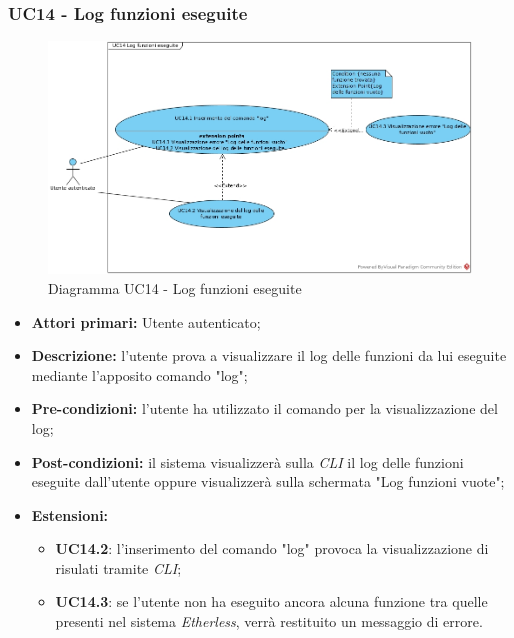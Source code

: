 \subsubsection{UC14 - Log funzioni eseguite}
\begin{figure}[h]
	\centering
	\includegraphics[width=\linewidth]{res/img/UC14.jpg}
	\caption{Diagramma UC14 - Log funzioni eseguite}
\end{figure}
\begin{itemize}
	\item \textbf{Attori primari:} Utente autenticato;
	\item \textbf{Descrizione:} l'utente prova a visualizzare il log delle funzioni da lui eseguite mediante l'apposito comando "log";
	\item \textbf{Pre-condizioni:} l'utente ha utilizzato il comando per la visualizzazione del log;
	\item \textbf{Post-condizioni:} il sistema visualizzerà sulla \textit{CLI\glo} il log delle funzioni eseguite dall'utente oppure visualizzerà sulla schermata "Log funzioni vuote";
	\item \textbf{Estensioni:}
	\begin{itemize}
		\item \textbf{UC14.2}: l'inserimento del comando "log" provoca la visualizzazione di risulati tramite \textit{CLI\glos};
		\item \textbf{UC14.3}: se l'utente non ha eseguito ancora alcuna funzione tra quelle presenti nel sistema \textit{Etherless\glos}, verrà restituito un messaggio di errore.
	\end{itemize}
\end{itemize}
